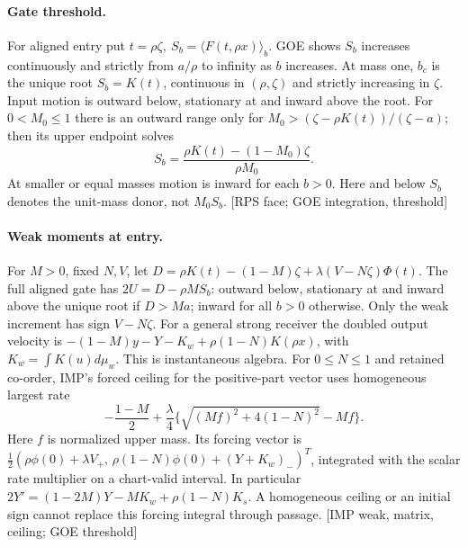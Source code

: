 \documentclass[11pt]{article}
\newcommand{\src}[1]{\textnormal{\small[#1]}}
\begin{document}
\paragraph{Gate threshold.}
For aligned entry put \(t=\rho\zeta,\ S_b=\langle F(t,\rho x)\rangle_b\).
GOE shows \(S_b\) increases continuously and strictly from \(a/\rho\)
to infinity as \(b\) increases. At mass one, \(b_c\) is the unique
root \(S_b=K(t)\), continuous in \((\rho,\zeta)\) and strictly increasing
in \(\zeta\). Input motion is outward below, stationary at and inward
above the root. For \(0<M_0\le1\) there is an outward range only for
\(M_0>(\zeta-\rho K(t))/(\zeta-a)\); then its upper endpoint solves
\[
 S_b=\frac{\rho K(t)-(1-M_0)\zeta}{\rho M_0}.
\]
At smaller or equal masses motion is inward for each \(b>0\).
Here and below \(S_b\) denotes the unit-mass donor, not \(M_0 S_b\).
\src{RPS face; GOE integration, threshold}

\paragraph{Weak moments at entry.}
For \(M>0\), fixed \(N,V\), let
\(D=\rho K(t)-(1-M)\zeta+\lambda(V-N\zeta)\Phi(t)\).
The full aligned gate has \(2U=D-\rho M S_b\): outward below,
stationary at and inward above the unique root if \(D>Ma\);
inward for all \(b>0\) otherwise. Only the weak increment has sign
\(V-N\zeta\). For a general strong receiver the doubled output velocity
is \(-(1-M)y-Y-K_w+\rho(1-N)K(\rho x)\), with
\(K_w=\int K(u)d\mu_w\). This is instantaneous algebra.
For \(0\le N\le1\) and retained co-order, IMP's forced ceiling for
the positive-part vector uses homogeneous largest rate
\[
 -\frac{1-M}{2}+
 \frac{\lambda}{4}\{\sqrt{(Mf)^2+4(1-N)^2}-Mf\}.
\]
Here \(f\) is normalized upper mass. Its forcing vector is
\(\tfrac12(\rho\phi(0)+\lambda V_+,\,
 \rho(1-N)\phi(0)+(Y+K_w)_-)^T\), integrated with the scalar rate
multiplier on a chart-valid interval. In particular \(2Y'=(1-2M)Y
-MK_w+\rho(1-N)K_s\). A homogeneous ceiling or an initial sign cannot
replace this forcing integral through passage.
\src{IMP weak, matrix, ceiling; GOE threshold}
\end{document}
